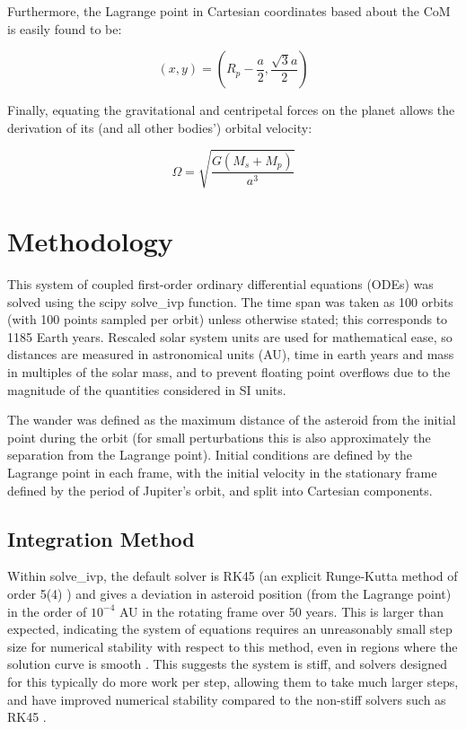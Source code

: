 \documentclass[11pt, a4paper,twocolumn]{article} %
\begin{document}
Furthermore, the Lagrange point in Cartesian coordinates based about the CoM is easily found to be:

\begin{equation}
(x,y) = \left( R_{p} - \frac{a}{2}, \frac{ \sqrt{3} a}{2} \right)
\end{equation}

Finally, equating the gravitational and centripetal forces on the planet allows the derivation of its (and all other bodies') orbital velocity:

\begin{equation}
\Omega = \sqrt{\frac{G (M_{s} + M_{p})}{a^{3}}}
\end{equation}

\section{Methodology}
This system of coupled first-order ordinary differential equations (ODEs) was solved using the scipy solve\_ivp function. The time span was taken as 100 orbits (with 100 points sampled per orbit) unless otherwise stated; this corresponds to 1185 Earth years. Rescaled solar system units are used for mathematical ease, so distances are measured in astronomical units (AU), time in earth years and mass in multiples of the solar mass, and to prevent floating point overflows due to the magnitude of the quantities considered in SI units.

The wander was defined as the maximum distance of the asteroid from the initial point during the orbit (for small perturbations this is also approximately the separation from the Lagrange point).
Initial conditions are defined by the Lagrange point in each frame, with the initial velocity in the stationary frame defined by the period of Jupiter's orbit, and split into Cartesian components.

\subsection{Integration Method}
Within solve\_ivp, the default solver is RK45 (an explicit Runge-Kutta method of order 5(4) \cite{Dormand1980}) and gives a deviation in asteroid position (from the Lagrange point) in the order of $ 10^{-4}$ AU in the rotating frame over 50 years. This is larger than expected, indicating the system of equations requires an unreasonably small step size for numerical stability with respect to this method, even in regions where the solution curve is smooth \cite{Lambert1991}. This suggests the system is stiff, and solvers designed for this typically do more work per step, allowing them to take much larger steps, and have improved numerical stability compared to the non-stiff solvers such as RK45 \cite{Byrne1987}. 
\end{document}
